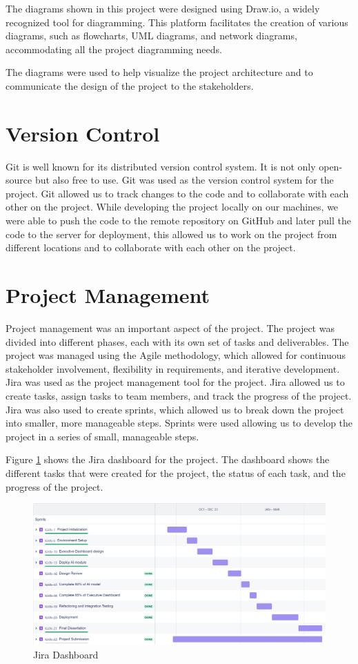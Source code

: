 The diagrams shown in this project were designed using Draw.io, a widely recognized tool for diagramming. This platform facilitates the creation of various 
diagrams, such as flowcharts, UML diagrams, and network diagrams, accommodating all the project diagramming needs.

The diagrams were used to help visualize the project architecture and to communicate the design of the
project to the stakeholders.

\section{Version Control}


Git is well known for its distributed version control system. It is not only open-source but also free to use.
Git was used as the version control system for the project. Git allowed us to track changes to the code and to collaborate with each other on the project.
While developing the project locally on our machines, we were able to push the code to the remote repository on GitHub and later pull the code to the server
for deployment, this allowed us to work on the project from different locations and to collaborate with each other on the project.

\section{Project Management}

Project management was an important aspect of the project. The project was divided into different phases, each with its own set of tasks and deliverables.
The project was managed using the Agile methodology, which allowed for continuous stakeholder involvement, flexibility in requirements, and iterative development.
Jira was used as the project management tool for the project. Jira allowed us to create tasks, assign tasks to team members, and track the progress of the project.
Jira was also used to create sprints, which allowed us to break down the project into smaller, more manageable steps. Sprints were used allowing us to develop 
the project in a series of small, manageable steps.

Figure \ref{fig:jira} shows the Jira dashboard for the project. The dashboard shows the different tasks that were created for the project, the status of each task, 
and the progress of the project. 

\begin{figure}[H]
    \centering
    \includegraphics[width=1.0\linewidth]{images/jira.png}
    \caption{Jira Dashboard}
    \label{fig:jira}
\end{figure}
